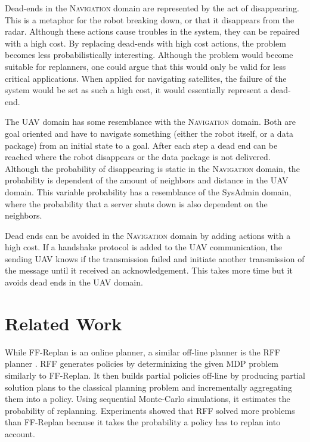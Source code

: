 \documentclass[runningheads,a4paper]{llncs}
\begin{document}
Dead-ends in the \textsc{Navigation} domain are represented by the act of disappearing.
This is a metaphor for the robot breaking down, or that it
disappears from the radar. Although these actions cause troubles in the system, they can be repaired with a high cost. By replacing dead-ends with high cost actions, the problem becomes less probabilistically interesting.
Although the problem would become suitable for replanners, one could argue that this would only be valid for less critical applications. When applied for
navigating satellites, the failure of the system would be set as such a high cost, it would essentially represent a dead-end.

The UAV domain has some resemblance with the \textsc{Navigation} domain. Both are goal
oriented and have to navigate something (either the robot itself, or a data
package) from an initial state to a goal. After each step a dead end can
be reached where the robot disappears or the data package is not delivered.
Although the probability of disappearing is static in the \textsc{Navigation} domain, the probability is dependent of the
amount of neighbors and distance in the UAV domain. This variable probability has a resemblance
of the SysAdmin domain, where the probability that a server shuts down is also
dependent on the neighbors.

Dead ends can be avoided in the \textsc{Navigation} domain by adding actions
with a high cost. If a handshake protocol is added to the UAV communication,
the sending UAV knows if the transmission failed and initiate another
transmission of the message until it received an acknowledgement. This takes
more time but it avoids dead ends in the UAV domain.


\section{Related Work}
\label{sec:related}

While FF-Replan is an online planner, a similar off-line planner is the RFF planner
\cite{teichteil2010incremental}. RFF generates policies by determinizing the
given MDP problem similarly to FF-Replan. It then builds partial policies off-line by producing partial
solution plans to the classical planning problem and incrementally aggregating
them into a policy. Using sequential Monte-Carlo simulations, it estimates the
probability of replanning. Experiments showed that RFF solved more problems
than FF-Replan because it takes the probability a policy has to replan into
account.
\end{document}
